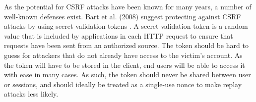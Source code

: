As the potential for CSRF attacks have been known for many years, a number of well-known defenses exist.
Bart et al. (2008) suggest protecting against CSRF attacks by using secret validation tokens \citep{barth_robust_2008}.
A secret validation token is a random value that is included by applications in each HTTP request to ensure that requests have been sent from an authorized source.
The token should be hard to guess for attackers that do not already have access to the victim's account.
As the token will have to be stored in the client, end users will be able to access it with ease in many cases.
As such, the token should never be shared between user or sessions, and should ideally be treated as a single-use nonce to make replay attacks less likely.
